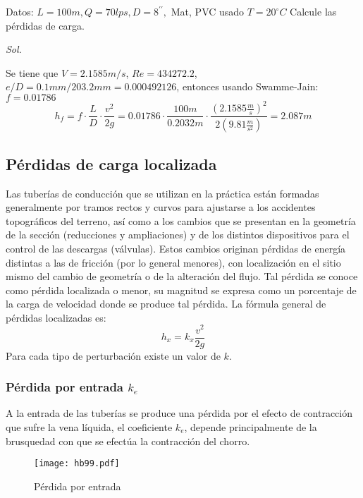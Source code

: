 \begin{example}
    Datos: $L=100 m, Q=70 lps,D=8^{\prime\prime},$ Mat, PVC usado $T=20^{\circ}C$ Calcule las pérdidas de carga.
\end{example}

\textit{ Sol. }

Se tiene que $V=2.1585m/s$, $Re=434272.2$, $e/D=0.1mm/203.2mm=0.000492126$, entonces usando Swamme-Jain: $f=0.01786$
\begin{equation*}
    h_f = f\cdot \frac{L}{D}\cdot \frac{v^2}{2g} =0.01786\cdot \frac{100m}{0.2032m}\cdot \frac{\left(2.1585 \frac{m}{s}\right)^2}{2\left(9.81\frac{m}{s^2}\right)} = 2.087m
\end{equation*}

\subsection{Pérdidas de carga localizada}
Las tuberías de conducción que se utilizan en la práctica están formadas generalmente por tramos rectos y curvos para ajustarse a los accidentes topográficos del terreno, así como a los cambios que se presentan en la geometría de la sección (reducciones y ampliaciones) y de los distintos dispositivos para el control de las descargas (válvulas). Estos cambios originan pérdidas de energía distintas a las de fricción (por lo general menores), con localización en el sitio mismo del cambio de geometría o de la alteración del flujo. Tal pérdida se conoce como pérdida localizada o menor, su magnitud se expresa como un porcentaje de la carga de velocidad donde se produce tal pérdida. La fórmula general de pérdidas localizadas es:
\begin{equation}
    h_x = k_x \frac{v^2}{2g}
\end{equation}
Para cada tipo de perturbación existe un valor de $k$.

\subsubsection{Pérdida por entrada $k_e$}
A la entrada de las tuberías se produce una pérdida por el efecto de contracción que sufre la vena líquida, el coeficiente $k_e$, depende principalmente de la brusquedad con que se efectúa la contracción del chorro.
\begin{figure}[h!]
\centering
  \texttt{[image: hb99.pdf]}
  \caption{Pérdida por entrada}
  \label{hb99}
\end{figure}

